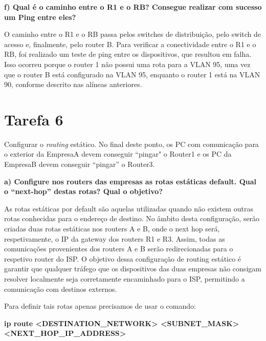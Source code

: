 \documentclass[11pt,english, openright, oneside]{book}
\begin{document}
\vspace{0.8cm}

\textbf{f) Qual é o caminho entre o R1 e o RB? Consegue realizar com sucesso um Ping entre eles?}
\vspace{0.2cm}

O caminho entre o R1 e o RB passa pelos switches de distribuição, pelo switch de
acesso e, finalmente, pelo router B. Para verificar a conectividade entre o R1 e
o RB, foi realizado um teste de ping entre os dispositivos, que resultou em
falha. Isso ocorreu porque o router 1 não possui uma rota para a VLAN 95, uma
vez que o router B está configurado na VLAN 95, enquanto o router 1 está na VLAN 90, conforme descrito nas alíneas anteriores.

\vspace{0.8cm}

\pagebreak
\section{Tarefa 6}
\vspace{0.2cm}

Configurar o \textit{routing} estático. No final deste ponto, os PC com
comunicação para o exterior da EmpresaA devem conseguir “pingar" o Router1 e os
PC da EmpresaB devem conseguir “pingar” o Router3.
\vspace{0.8cm}

\textbf{a) Configure nos routers das empresas as rotas estáticas default. Qual o “next-hop” destas rotas? Qual o objetivo?}
\vspace{0.2cm}

As rotas estáticas por default são aquelas utilizadas quando não existem outras rotas conhecidas para o endereço de destino. No âmbito desta configuração, serão criadas duas rotas estáticas nos routers A e B, onde o next hop será, respetivamente, o IP da gateway dos routers R1 e R3. Assim, todas as comunicações provenientes dos routers A e B serão redirecionadas para o respetivo router do ISP. O objetivo dessa configuração de routing estático é garantir que qualquer tráfego que os dispositivos das duas empresas não consigam resolver localmente seja corretamente encaminhado para o ISP, permitindo a comunicação com destinos externos. \par \vspace{0.2cm}

Para definir tais rotas apenas precisamos de usar o comando: \par \vspace{0.4cm}
\small{\textbf{ip route <DESTINATION\_NETWORK> <SUBNET\_MASK><NEXT\_HOP\_IP\_ADDRESS>}}
\par \vspace{1.2cm}
\end{document}

